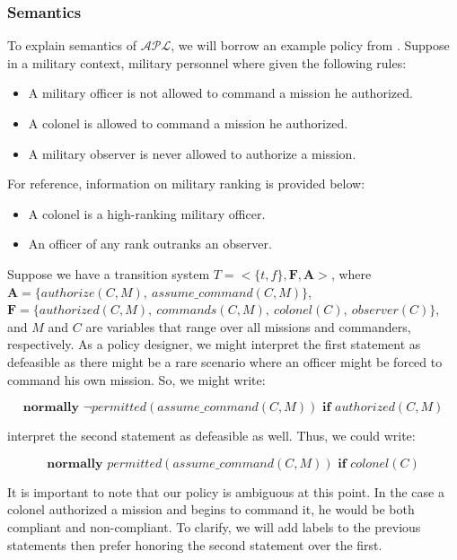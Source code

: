 \subsubsection{Semantics}

To explain semantics of $\mathcal{APL}$, we will borrow an example policy from \citet{gelfond_authorization_2008}.
Suppose in a military context, military personnel where given the following rules:

\begin{itemize}
    \item A military officer is not allowed to command a mission he authorized.
    \item A colonel is allowed to command a mission he authorized.
    \item A military observer is never allowed to authorize a mission.
\end{itemize}

For reference, information on military ranking is provided below:

\begin{itemize}
    \item A colonel is a high-ranking military officer.
    \item An officer of any rank outranks an observer.
\end{itemize}

Suppose we have a transition system $T=<\{t,f\},\boldsymbol{F},\boldsymbol{A}>$, where $\boldsymbol{A}=\{authorize(C,M),\ assume\_command(C, M)\}$, $\boldsymbol{F}=\{authorized(C,M),\ commands(C,M),\ colonel(C),\ observer(C)\}$, and $M$ and $C$ are variables that range over all missions and commanders, respectively.
As a policy designer, we might interpret the first statement as defeasible as there might be a rare scenario where an officer might be forced to command his own mission.
So, we might write:

$$
\textbf{normally } \neg permitted(assume\_command(C, M)) \textbf{ if } authorized(C, M)
$$

\citet{gelfond_authorization_2008} interpret the second statement as defeasible as well.
Thus, we could write:

$$
\textbf{normally } permitted(assume\_command(C, M)) \textbf{ if } colonel(C)
$$

It is important to note that our policy is ambiguous at this point.
In the case a colonel authorized a mission and begins to command it, he would be both compliant and non-compliant.
To clarify, we will add labels to the previous statements then prefer honoring the second statement over the first.

